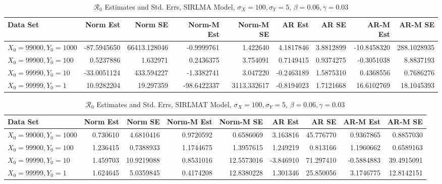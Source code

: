 \documentclass[12pt]{article}
\newcommand{\rr}{\ensuremath{\mathcal{R}_0}}
\begin{document}
\begin{table}[H]
	
	\caption{\label{tab:}$\rr$ Estimates and Std. Errs, SIRLMA Model,
		$\sigma_X = 100, \sigma_Y = 5$, $\beta = 0.06, \gamma = 0.03$}
	\centering
	\begin{footnotesize}
	\begin{tabular}[t]{l|r|r|r|r|r|r|r|r}
		\hline
		Data Set & Norm Est & Norm SE & Norm-M Est & Norm-M SE & AR Est & AR SE & AR-M Est & AR-M SE\\
		\hline
		$X_0 = 99000, Y_0 = 1000$ & -87.5945650 & 66413.128046 & -0.9999761 & 1.422640 & 4.1817846 & 3.8812899 & -10.8458320 & 288.1028935\\
		\hline
		$X_0 = 99900, Y_0 = 100$ & 0.5237886 & 1.632971 & 0.2436375 & 3.754091 & 0.7149415 & 0.9374275 & -0.3051038 & 8.8837193\\
		\hline
		$X_0 = 99990, Y_0 = 10$ & -33.0051124 & 433.594227 & -1.3382741 & 3.047220 & -0.2463189 & 1.5875310 & 0.4368556 & 0.7686276\\
		\hline
		$X_0 = 99999, Y_0 = 1$ & 10.9282204 & 19.297359 & -98.6422337 & 3113.332617 & -0.8194023 & 1.7121668 & 16.6102769 & 18.1045393\\
		\hline
	\end{tabular}
\end{footnotesize}
\end{table}
\begin{table}[H]
	
	\caption{\label{tab:}$\rr$ Estimates and Std. Errs, SIRLMAT Model,
		$\sigma_X = 100, \sigma_Y = 5$, $\beta = 0.06, \gamma = 0.03$}
	\centering
	\begin{footnotesize}
	\begin{tabular}[t]{l|r|r|r|r|r|r|r|r}
		\hline
		Data Set & Norm Est & Norm SE & Norm-M Est & Norm-M SE & AR Est & AR SE & AR-M Est & AR-M SE\\
		\hline
		$X_0 = 99000, Y_0 = 1000$ & 0.730610 & 4.6810416 & 0.9720592 & 0.6586069 & 3.163816 & 45.776770 & 0.9367865 & 0.8857030\\
		\hline
		$X_0 = 99900, Y_0 = 100$ & 1.236415 & 0.7388933 & 1.1744675 & 1.3957615 & 1.249219 & 0.813166 & 1.1960662 & 0.6589163\\
		\hline
		$X_0 = 99990, Y_0 = 10$ & 1.459703 & 10.9219088 & 0.8531016 & 12.5573016 & -3.846910 & 71.297410 & -0.5884883 & 39.4915091\\
		\hline
		$X_0 = 99999, Y_0 = 1$ & 1.624645 & 5.0359845 & 0.4174208 & 12.8380228 & 1.301346 & 25.850056 & 3.1746775 & 12.8142151\\
		\hline
	\end{tabular}
\end{footnotesize}
\end{table}
\end{document}
